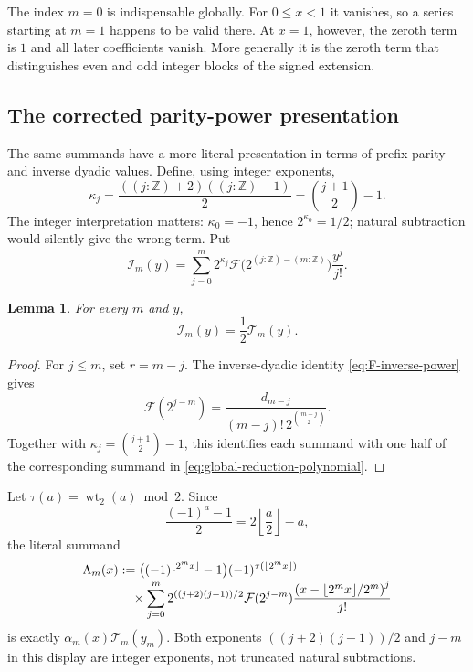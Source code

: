 \documentclass[11pt,oneside]{article}
\newtheorem{lemma}[theorem]{Lemma}
\theoremstyle{definition}
\theoremstyle{remark}
\newcommand{\Z}{\mathbb Z}
\newcommand{\wt}{\operatorname{wt}_2}
\begin{document}
The index $m=0$ is indispensable globally.  For $0\le x<1$ it vanishes, so a series
starting at $m=1$ happens to be valid there.  At $x=1$, however, the zeroth term is $1$ and
all later coefficients vanish.  More generally it is the zeroth term that distinguishes
even and odd integer blocks of the signed extension.

\subsection{The corrected parity-power presentation}
\label{subsec:corrected-parity-power}

The same summands have a more literal presentation in terms of prefix parity and inverse
dyadic values.  Define, using integer exponents,
\begin{equation}
 \kappa_j=\frac{((j:\Z)+2)((j:\Z)-1)}2
 =\binom{j+1}{2}-1.                                      \label{eq:parity-power-integer-exponent}
\end{equation}
The integer interpretation matters: $\kappa_0=-1$, hence $2^{\kappa_0}=1/2$; natural
subtraction would silently give the wrong term.  Put
\begin{equation}
 \mathcal I_m(y)=\sum_{j=0}^{m}
 2^{\kappa_j}\mathcal F\bigl(2^{(j:\Z)-(m:\Z)}\bigr)
 \frac{y^j}{j!}.                                         \label{eq:parity-power-inner}
\end{equation}

\begin{lemma}
For every $m$ and $y$,
\begin{equation}
 \mathcal I_m(y)=\frac12\mathcal T_m(y).                 \label{eq:parity-power-half-reduction}
\end{equation}
\end{lemma}

\begin{proof}
For $j\le m$, set $r=m-j$.  The inverse-dyadic identity
\eqref{eq:F-inverse-power} gives
\begin{equation*}
 \mathcal F(2^{j-m})=
 \frac{d_{m-j}}{(m-j)!\,2^{\binom{m-j}{2}}}.
\end{equation*}
Together with $\kappa_j=\binom{j+1}{2}-1$, this identifies each summand with one half of
the corresponding summand in \eqref{eq:global-reduction-polynomial}.
\end{proof}

Let $\tau(a)=\wt(a)\bmod2$.  Since
\begin{equation*}
 \frac{(-1)^a-1}{2}=2\left\lfloor\frac a2\right\rfloor-a,
\end{equation*}
the literal summand
\begin{align}
 \Lambda_m(x)
 &:=
 \bigl((-1)^{\lfloor2^mx\rfloor}-1\bigr)
 (-1)^{\tau(\lfloor2^mx\rfloor)}                         \notag\\[-2pt]
 &\quad\times
 \sum_{j=0}^{m}2^{((j+2)(j-1))/2}
 \mathcal F(2^{j-m})
 \frac{\left(x-\lfloor2^mx\rfloor/2^m\right)^j}{j!}     \label{eq:parity-power-literal-summand}
\end{align}
is exactly $\alpha_m(x)\mathcal T_m(y_m)$.  Both exponents
$((j+2)(j-1))/2$ and $j-m$ in this display are integer exponents, not truncated natural
subtractions.
\end{document}
